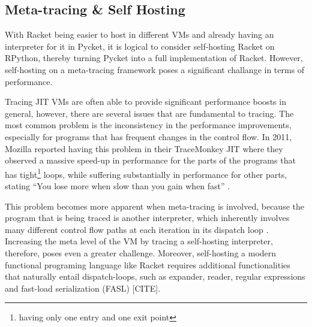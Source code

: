 \subsection{Meta-tracing \& Self Hosting}
\label{subsec:self-hosting-problem}

With Racket being easier to host in different VMs and already having
an interpreter for it in Pycket, it is logical to consider
self-hosting Racket on RPython, thereby turning Pycket into a full
implementation of Racket. However, self-hosting on a meta-tracing
framework poses a significant challange in terms of performance.

Tracing JIT VMs are often able to provide significant performance
boosts in general, however, there are several issues that are
fundamental to tracing. The most common problem is the inconsistency
in the performance improvements, especially for programs that has
frequent changes in the control flow. In 2011, Mozilla reported having
this problem in their TraceMonkey JIT where they observed a massive
speed-up in performance for the parts of the programs that has
tight\footnote{having only one entry and one exit point} loops, while
suffering substantially in performance for other parts, stating ``You
lose more when slow than you gain when fast'' \cite{mozblog}.

This problem becomes more apparent when meta-tracing is involved,
because the program that is being traced is another interpreter, which
inherently involves many different control flow paths at each
iteration in its dispatch loop \cite{bolz15-meta-vm}. Increasing the
meta level of the VM by tracing a self-hosting interpreter, therefore,
poses even a greater challenge. Moreover, self-hosting a modern
functional programing language like Racket requires additional
functionalities that naturally entail dispatch-loops, such as
expander, reader, regular expressions and fast-load serialization
(FASL) [CITE].
